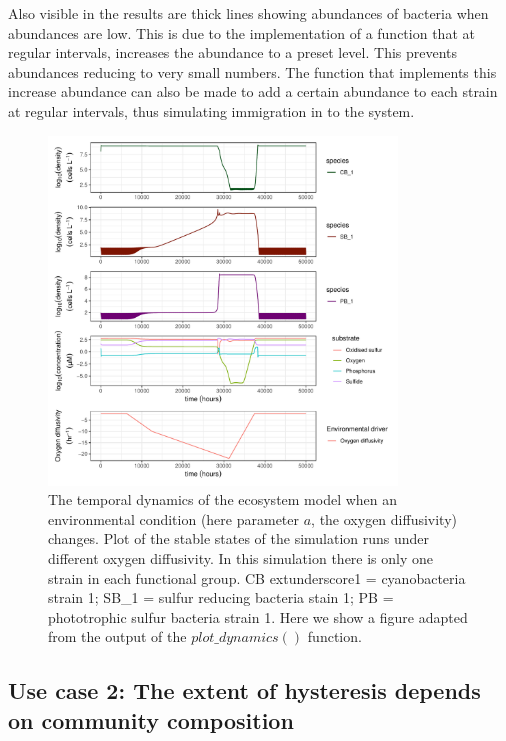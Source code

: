 \documentclass[preprint,12pt, a4paper]{elsarticle}
\begin{document}
Also visible in the results are thick lines showing abundances of
bacteria when abundances are low. This is due to the implementation of a
function that at regular intervals, increases the abundance to a preset
level. This prevents abundances reducing to very small numbers. The
function that implements this increase abundance can also be made to add
a certain abundance to each strain at regular intervals, thus simulating
immigration in to the system.

\begin{figure}

{\centering \includegraphics[width=350px]{figures/gen_uc1_partrep_temporal_state_switching} 

}

\caption{The temporal dynamics of the ecosystem model when an environmental condition (here parameter $a$, the oxygen diffusivity) changes. Plot of the stable states of the simulation runs under different oxygen diffusivity. In this simulation there is only one strain in each functional group. CB   extunderscore1 = cyanobacteria strain 1; SB\_1 = sulfur reducing bacteria stain 1; PB = phototrophic sulfur bacteria strain 1. Here we show a figure adapted from the output of the $plot\_dynamics()$  function.}\label{fig:uc1}
\end{figure}

\hypertarget{use-case-2-the-extent-of-hysteresis-depends-on-community-composition}{%
\subsection{Use case 2: The extent of hysteresis depends on community
composition}\label{use-case-2-the-extent-of-hysteresis-depends-on-community-composition}}
\end{document}
